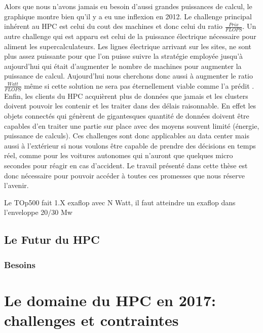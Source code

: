 Alors que nous n'avons jamais eu besoin d'aussi grandes puissances de calcul, le graphique montre bien qu'il y a eu une inflexion en 2012. Le challenge principal inhérent au HPC est celui du cout des machines et donc celui du ratio $\frac{Prix}{FLOPS}$. Un autre challenge qui est apparu est celui de la puissance électrique nécessaire pour aliment les supercalculateurs. Les lignes électrique arrivant sur les sites, ne sont plus assez puissante pour que l'on puisse suivre la stratégie employée jusqu'à aujourd'hui qui était d'augmenter le nombre de machines pour augmenter la puissance de calcul. Aujourd'hui nous cherchons donc aussi à augmenter le ratio $\frac{Watt}{FLOPS}$ même si cette solution ne sera pas éternellement viable comme l'a prédit \cite{5392446}.
Enfin, les clients du HPC acquièrent plus de données que jamais et les clusters doivent pouvoir les contenir et les traiter dans des délais raisonnable. En effet les objets connectés qui génèrent de gigantesques quantité de données doivent être capables d'en traiter une partie sur place avec des moyens souvent limité (énergie, puissance de calculs). Ces challenges sont donc applicables au data center mais aussi à l'extérieur si nous voulons être capable de prendre des décisions en temps réel, comme pour les voitures autonomes qui n'auront que quelques micro secondes pour réagir en cas d'accident. Le travail présenté dans cette thèse est donc nécessaire pour pouvoir accéder à toutes ces promesses que nous réserve l'avenir.

Le TOp500 fait 1.X exaflop avec N Watt, il faut atteindre un exaflop dans l'enveloppe 20/30 Mw



   
\subsection{Le Futur du HPC}

    \subsubsection{Besoins}


\section{Le domaine du HPC en 2017: challenges et contraintes}




